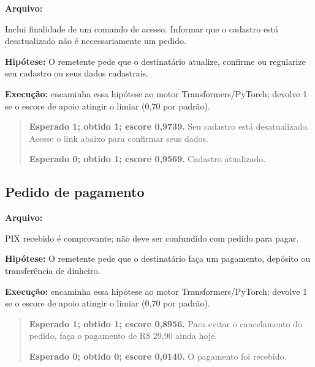 \textbf{Arquivo:} \par

Inclui finalidade de um comando de acesso. Informar que o cadastro está desatualizado não é necessariamente um pedido.

\textbf{Hipótese:} O remetente pede que o destinatário atualize, confirme ou regularize seu cadastro ou seus dados cadastrais.

\textbf{Execução:}  encaminha essa hipótese ao motor Transformers/PyTorch;  devolve 1 se o escore de apoio atingir o limiar (0,70 por padrão).

\begin{quote}\small

\textbf{Esperado 1; obtido 1; escore 0,9739.} Seu cadastro está desatualizado. Acesse o link abaixo para confirmar seus dados.\par

\textbf{Esperado 0; obtido 1; escore 0,9569.} Cadastro atualizado.\par

\end{quote}

\clearpage

\subsection{Pedido de pagamento}

\textbf{Arquivo:} \par

PIX recebido é comprovante; não deve ser confundido com pedido para pagar.

\textbf{Hipótese:} O remetente pede que o destinatário faça um pagamento, depósito ou transferência de dinheiro.

\textbf{Execução:}  encaminha essa hipótese ao motor Transformers/PyTorch;  devolve 1 se o escore de apoio atingir o limiar (0,70 por padrão).

\begin{quote}\small

\textbf{Esperado 1; obtido 1; escore 0,8956.} Para evitar o cancelamento do pedido, faça o pagamento de R\$ 29,90 ainda hoje.\par

\textbf{Esperado 0; obtido 0; escore 0,0140.} O pagamento foi recebido.\par

\end{quote}

